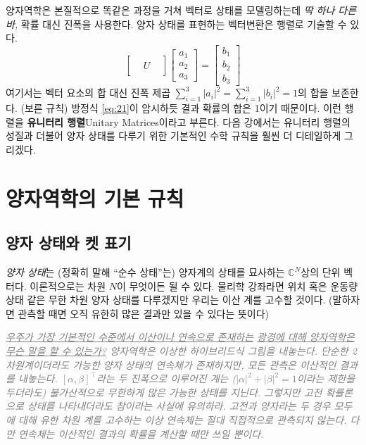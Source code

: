 \documentclass[a4paper,chapter,atbegshi,]{oblivoir}
\begin{document}
양자역학은 본질적으로 똑같은 과정을 거쳐 벡터로 상태를 모델링하는데 \emph{딱
하나 다른 바,} 확률 대신 진폭을 사용한다. 양자 상태를 표현하는 벡터변환은 
행렬로 기술할 수 있다.
\begin{equation}
  \begin{bmatrix} & & \\ & U & \\ & &\end{bmatrix}
  \begin{bmatrix}a_1\\a_2\\a_3\end{bmatrix}=
  \begin{bmatrix}b_1\\b_2\\b_3\end{bmatrix}
\end{equation}
여기서는 벡터 요소의 합 대신 진폭 제곱 $\sum_{i=1}^3 |a_i|^2 = \sum_{i=1}^3
|b_i|^2 = 1$의 합을 보존한다. (보른 규칙) 방정식 \ref{eq:21}이
암시하듯 결과 확률의 합은 1이기 때문이다. 이런 행렬을 \textbf{유니터리
행렬}{\footnotesize Unitary Matrices}이라고 부른다. 다음 강에서는 
유니터리 행렬의 성질과 더불어 양자 상태를 다루기 위한 기본적인
수학 규칙을 훨씬 더 디테일하게 그리겠다.
\chapter{양자역학의 기본 규칙}
\section{양자 상태와 켓 표기}
\emph{양자 상태}는 (정확히 말해 ``순수 상태''는) 양자계의 상태를 묘사하는
$\mathbb{C}^N$상의 단위 벡터다. 이론적으로는 차원 $N$이 무엇이든 될 수 있다. 
물리학 강좌라면 위치 혹은 운동량 상태 같은 무한 차원 양자 상태를
다루겠지만 우리는 이산 계를 고수할 것이다. (말하자면 관측할 때면
오직 유한히 많은 결과만 있을 수 있다는 뜻이다) 

\hfill

\hfill\parbox[t]{9cm}{\itshape\textcolor{gray}{\underline{우주가 가장 기본적인
  수준에서 이산이나 연속으로 존재하는} \underline{광경에 대해 양자역학은 
  무슨 말을 할 수 있는가?} 양자역학은 이상한 하이브리드식 그림을 내놓는다.
  단순한 2차원계이더라도 가능한 양자 상태의 연속체가 존재하지만, 모든
관측은 이산적인 결과를 내놓는다. $[\alpha, \beta]^{\top}$라는 두 진폭으로
이루어진 계는 ($|\alpha|^2+|\beta|^2=1$이라는 제한을 두더라도) 
불가산적으로 무한하게 많은 가능한 상태를 지닌다. 그렇지만 고전 확률론으로 
상태를 나타내더라도 참이라는 사실에 유의하라. 고전과 양자라는 두 경우 모두에
대해 유한 차원 계를 고수하는 이상 연속체는 절대 직접적으로 관측되지
않는다. 다만 연속체는 이산적인 결과의 확률을 계산할 때만 쓰일 뿐이다.}}
\end{document}
